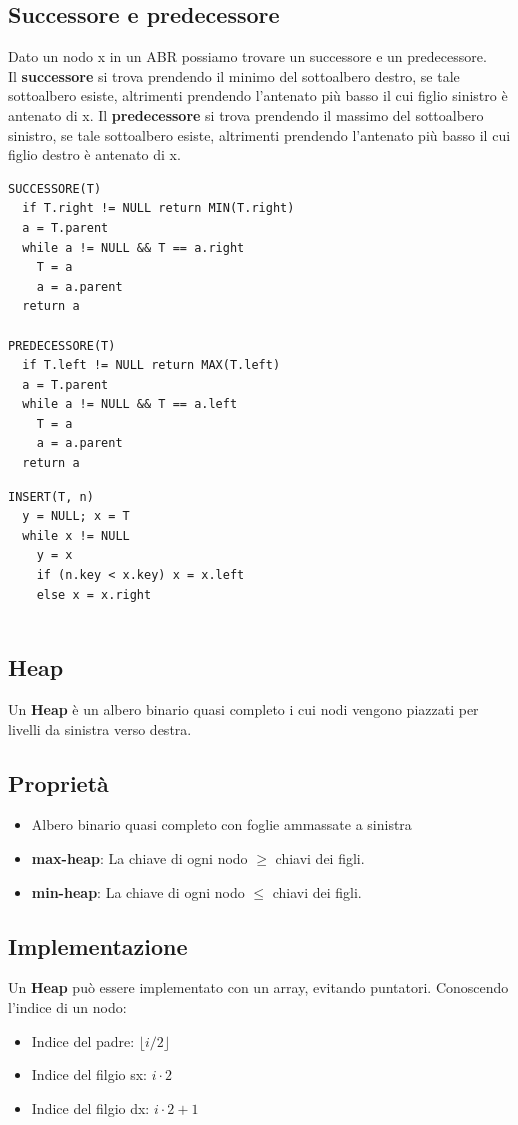 \documentclass{article}
\begin{document}
\subsection*{Successore e predecessore}
Dato un nodo x in un ABR possiamo trovare un successore e un predecessore.\\
Il \textbf{successore} si trova prendendo il minimo del sottoalbero destro, se tale sottoalbero esiste, altrimenti prendendo l'antenato più basso il cui figlio sinistro è antenato di x.
Il \textbf{predecessore} si trova prendendo il massimo del sottoalbero sinistro, se tale sottoalbero esiste, altrimenti prendendo l'antenato più basso il cui figlio destro è antenato di x.
\begin{lstlisting}
SUCCESSORE(T)
  if T.right != NULL return MIN(T.right)
  a = T.parent
  while a != NULL && T == a.right
    T = a
    a = a.parent
  return a

PREDECESSORE(T)
  if T.left != NULL return MAX(T.left)
  a = T.parent
  while a != NULL && T == a.left
    T = a
    a = a.parent
  return a
\end{lstlisting}

\begin{lstlisting}
INSERT(T, n)
  y = NULL; x = T
  while x != NULL
    y = x
    if (n.key < x.key) x = x.left
    else x = x.right
    
\end{lstlisting}
\pagebreak

\subsection{Heap}
Un \textbf{Heap} è un albero binario quasi completo i cui nodi vengono piazzati per livelli da sinistra verso destra.
\subsection*{Proprietà}
\begin{itemize}
  \item Albero binario quasi completo con foglie ammassate a sinistra
  \item \textbf{max-heap}: La chiave di ogni nodo \(\geq\) chiavi dei figli.
  \item \textbf{min-heap}: La chiave di ogni nodo \(\leq\) chiavi dei figli.
\end{itemize}
\subsection*{Implementazione}
Un \textbf{Heap} può essere implementato con un array, evitando puntatori. Conoscendo l'indice di un nodo:
\begin{itemize}
  \item Indice del padre: \(\lfloor i / 2 \rfloor\)
  \item Indice del filgio sx: \(i \cdot 2\)
  \item Indice del filgio dx: \(i \cdot 2 + 1\)
\end{itemize}
\pagebreak
\end{document}
